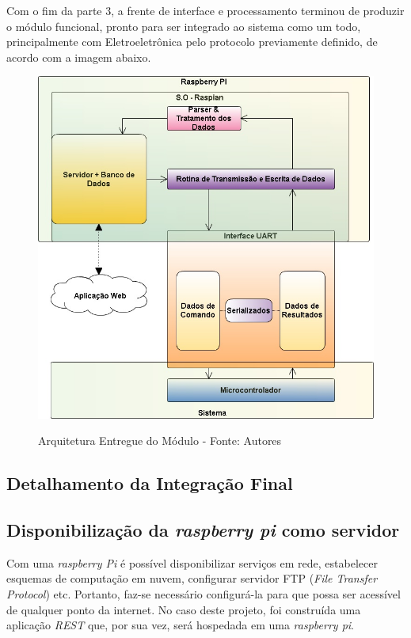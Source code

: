 Com o fim da parte 3, a frente de interface e processamento terminou de produzir o módulo funcional, pronto para ser integrado ao sistema como um todo, principalmente com Eletroeletrônica pelo protocolo previamente definido, de acordo com a imagem abaixo.

\begin{figure}[H]
  \centering
  \includegraphics[keepaspectratio=true,scale=0.7]{figuras/nova_arquitetura.png}
  \label{fig:nova_arquitetura}
  \caption{Arquitetura Entregue do Módulo - Fonte: Autores}
\end{figure}


\subsection{Detalhamento da Integração Final}

\subsection{Disponibilização da \textit{raspberry pi} como servidor}

Com uma \textit{raspberry Pi} é possível disponibilizar serviços em rede, estabelecer esquemas de computação em nuvem, configurar servidor FTP (\textit{File Transfer Protocol}) etc. Portanto, faz-se necessário configurá-la para que possa ser acessível de qualquer ponto da internet. No caso deste projeto, foi construída uma aplicação \textit{REST} que, por sua vez, será hospedada em uma \textit{raspberry pi}.

